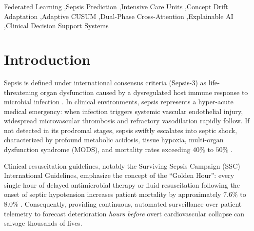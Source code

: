 \documentclass[final,5p,times,twocolumn]{elsarticle}
\begin{document}
\begin{frontmatter}
\begin{abstract}
2.48~GB in Ditto), while empirical 6-round logs demonstrated a 0.38\% reduction during selective freeze rounds. Paired with an operational point-of-care Clinical Decision Support System (CDSS) providing temporal window attributions, physiological feature saliency via Integrated Gradients, and counterfactual intervention simulation with a cohort mean early warning lead time of \textbf{4.98 hours} (up to 5.8 hours in exemplar cases), FPDAF provides an empirically grounded, privacy-preserving foundation for decentralized early sepsis surveillance.
\end{abstract}

\begin{keyword}
Federated Learning \sep Sepsis Prediction \sep Intensive Care Units \sep Concept Drift Adaptation \sep Adaptive CUSUM \sep Dual-Phase Cross-Attention \sep Explainable AI \sep Clinical Decision Support Systems
\end{keyword}

\end{frontmatter}

\section{Introduction}
Sepsis is defined under international consensus criteria (Sepsis-3) as life-threatening organ dysfunction caused by a dysregulated host immune response to microbial infection \cite{singer2016sepsis3}. In clinical environments, sepsis represents a hyper-acute medical emergency: when infection triggers systemic vascular endothelial injury, widespread microvascular thrombosis and refractory vasodilation rapidly follow. If not detected in its prodromal stages, sepsis swiftly escalates into septic shock, characterized by profound metabolic acidosis, tissue hypoxia, multi-organ dysfunction syndrome (MODS), and mortality rates exceeding $40\%$ to $50\%$ \cite{evans2021surviving,dusing2025sepsis}. 

Clinical resuscitation guidelines, notably the Surviving Sepsis Campaign (SSC) International Guidelines, emphasize the concept of the ``Golden Hour'': every single hour of delayed antimicrobial therapy or fluid resuscitation following the onset of septic hypotension increases patient mortality by approximately $7.6\%$ to $8.0\%$ \cite{evans2021surviving}. Consequently, providing continuous, automated surveillance over patient telemetry to forecast deterioration \textit{hours before} overt cardiovascular collapse can salvage thousands of lives.
\end{document}
